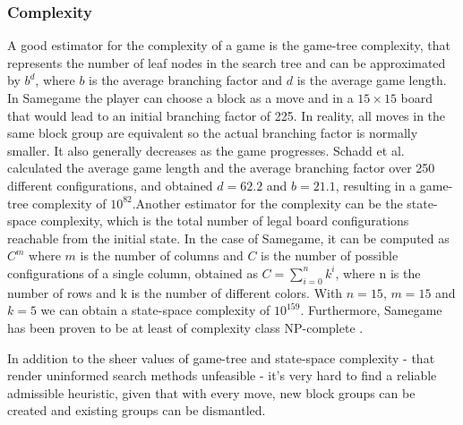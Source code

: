 \subsubsection{Complexity}
A good estimator for the complexity of a game is the game-tree complexity, that represents the number of leaf nodes in the search tree and can be approximated by $b^d$, where $b$ is the average branching factor and $d$ is the average game length. In Samegame the player can choose a block as a move and in a $15\times 15$ board that would lead to an initial branching factor of 225. In reality, all moves in the same block group are equivalent so the actual branching factor is normally smaller. It also generally decreases as the game progresses. Schadd et al. \cite{DBLP:journals/kbs/SchaddWTU12} calculated the average game length and the average branching factor over 250 different configurations, and obtained $d=62.2$ and $b=21.1$, resulting in a game-tree complexity of $10^{82}$.Another estimator for the complexity can be the state-space complexity, which is the total number of legal board configurations reachable from the initial state. In the case of Samegame, it can be computed as $C^m$ where $m$ is the number of columns and $C$ is the number of possible configurations of a single column, obtained as $C=\sum_{i=0}^n{k^i}$, where n is the number of rows and k is the number of different colors. With $n=15$, $m=15$ and $k=5$ we can obtain a state-space complexity of $10^{159}$. Furthermore, Samegame has been proven to be at least of complexity class NP-complete \cite{DBLP:journals/kbs/SchaddWTU12}.

\medskip\noindent
In addition to the sheer values of game-tree and state-space complexity - that render uninformed search methods unfeasible - it's very hard to find a reliable admissible heuristic, given that with every move, new block groups can be created and existing groups can be dismantled.